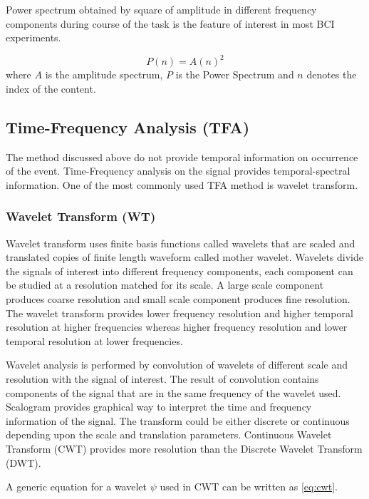 Power spectrum  obtained by square of amplitude in different frequency components during course of the task is the feature of interest in most BCI experiments.

\begin{equation} \label{eq:pwr}
    P(n) = A(n)^2
\end{equation}
where $A$ is the amplitude spectrum, $P$ is the Power Spectrum and $n$ denotes the index of the content.

\subsection{Time-Frequency Analysis (TFA)}
The method discussed above do not provide temporal information on occurrence of the event. Time-Frequency analysis on the signal provides temporal-spectral information. One of the most commonly used TFA method is wavelet transform.

\subsubsection{Wavelet Transform (WT)}
Wavelet transform uses finite basis functions called wavelets that are scaled and translated copies of finite length waveform called mother wavelet. Wavelets divide the signals of interest into different frequency components, each component can be studied at a resolution matched for its scale. A large scale component produces coarse resolution and small scale component produces fine resolution. The wavelet transform provides lower frequency resolution and higher temporal resolution at higher frequencies whereas higher frequency resolution and lower temporal resolution at lower frequencies. \par

Wavelet analysis is performed by convolution of wavelets of different scale and resolution with the signal of interest. The result of convolution contains components of the signal that are in the same frequency of the wavelet used. Scalogram provides graphical way to interpret the time and frequency information of the signal. The transform could be either discrete or continuous depending upon the scale and translation parameters. Continuous Wavelet Transform (CWT) provides more resolution than the Discrete Wavelet Transform (DWT).

A generic equation for a wavelet $\psi$ used in CWT can be written as \ref{eq:cwt}.

